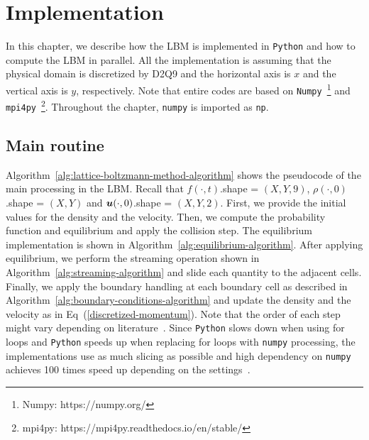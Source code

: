 \chapter{Implementation}
\vspace{-8mm}
In this chapter, we describe how the LBM is implemented in {\tt Python}
and how to compute the LBM in parallel.
All the implementation is assuming that
the physical domain is discretized by D2Q9
and the horizontal axis is $x$ and 
the vertical axis is $y$, respectively.
Note that entire codes are based on
{\tt Numpy}~\footnote{Numpy: https://numpy.org/}
and {\tt mpi4py}~\footnote{mpi4py: https://mpi4py.readthedocs.io/en/stable/}.
Throughout the chapter, {\tt numpy} is imported as {\tt np}.

\section{Main routine}
Algorithm~\ref{alg:lattice-boltzmann-method-algorithm}
shows the pseudocode of the main processing in the LBM.
Recall that $f(\cdot, t)$.shape = $(X, Y, 9)$,
$\rho(\cdot, 0)$.shape = $(X, Y)$ and $\boldsymbol{u}(\cdot, 0)$.shape = $(X, Y, 2)$.
First, we provide the initial values for the density and the velocity.
Then, we compute the probability function and equilibrium and
apply the collision step.
The equilibrium implementation is shown in Algorithm~\ref{alg:equilibrium-algorithm}.
After applying equilibrium, we perform the
streaming operation shown in Algorithm~\ref{alg:streaming-algorithm}
and slide each quantity to the adjacent cells.
Finally, we apply the boundary handling at each boundary cell as 
described in Algorithm~\ref{alg:boundary-conditions-algorithm}
and update the density and the velocity as in Eq~(\ref{discretized-momentum}).
Note that the order of each step might vary depending on literature~\cite{timm2016lattice, succi2018lattice}.
Since {\tt Python} slows down when using for loops
and {\tt Python} speeds up when replacing for loops with {\tt numpy} processing,
the implementations use as much slicing as possible
and high dependency on {\tt numpy} achieves 100 times speed up depending on
the settings~\cite{van2011numpy}. 

